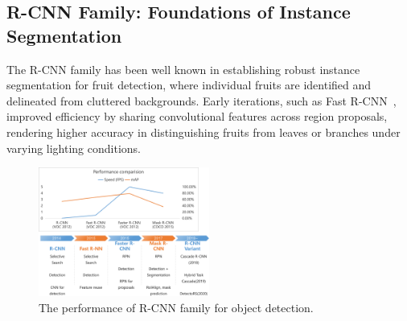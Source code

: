 \documentclass[a4paper,fleqn]{cas-dc}
\begin{document}
\subsection{R-CNN Family: Foundations of Instance Segmentation}
The R-CNN family has been well known in establishing robust instance segmentation for fruit detection, where individual fruits are identified and delineated from cluttered backgrounds. Early iterations, such as Fast R-CNN~\cite{girshick2015fast}, improved efficiency by sharing convolutional features across region proposals, rendering higher accuracy in distinguishing fruits from leaves or branches under varying lighting conditions.
\begin{figure}[hbtp]
\centering
\includegraphics[width=0.5\textwidth]{fig_rcnn1.png}
\caption{The performance of R-CNN family for object detection.}
\label{fig:performance_rcnn}
\end{figure}
\end{document}
